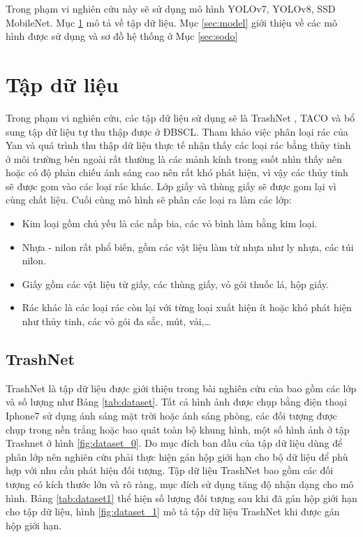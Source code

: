 \documentclass[../the.tex]{subfiles}
\begin{document}
{\fontsize{13}{12} \selectfont

Trong phạm vi nghiên cứu này sẽ sử dụng mô hình YOLOv7, YOLOv8, SSD MobileNet. Mục \ref{sec:dataset} mô tả về tập dữ liệu. Mục \ref{sec:model} giới thiệu về các mô hình được sử dụng và sơ đồ hệ thống ở Mục \ref{sec:sodo}

}
\section{Tập dữ liệu}
\label{sec:dataset}

{\fontsize{13}{12} \selectfont

	Trong phạm vi nghiên cứu, các tập dữ liệu sử dụng sẽ là TrashNet \cite{yang2016classification}, TACO \cite{proença2020taco} và bổ sung tập dữ liệu tự thu thập được ở ĐBSCL.
	Tham khảo việc phân loại rác của Yan \cite{yang2016classification} và quá trình thu thập dữ liệu thực tế nhận thấy các loại rác bằng thủy tinh ở môi trường bên ngoài rất thường là các mảnh kính trong suốt nhìn thấy nên hoặc có độ phản chiếu ánh sáng cao nên rất khó phát hiện, vì vậy các thủy tinh sẽ được gom vào các loại rác khác.
	Lớp giấy và thùng giấy sẽ được gom lại vì cùng chất liệu. Cuối cùng mô hình sẽ phân các loại ra làm các lớp:
	\begin{itemize}
		\item Kim loại gồm chủ yếu là các nắp bia, các vỏ bình làm bằng kim loại.
		\item Nhựa - nilon rất phổ biến, gồm các vật liệu làm từ nhựa như ly nhựa, các túi nilon.
		\item Giấy gồm các vật liệu từ giấy, các thùng giấy, vỏ gói thuốc lá, hộp giấy.
		\item Rác khác là các loại rác còn lại với từng loại xuất hiện ít hoặc khó phát hiện như thủy tinh, các vỏ gói đa sắc,
		      mút, vải,\dots
	\end{itemize}
}

\subsection{TrashNet}
\label{sec:trashnet}
{\fontsize{13}{12} \selectfont

	TrashNet là tập dữ liệu được giới thiệu trong bài nghiên cứu của \cite{yang2016classification} bao gồm các lớp và số lượng như Bảng \ref{tab:dataset}. Tất cả hình ảnh được chụp bằng điện thoại Iphone7 sử dụng ánh sáng mặt trời hoặc ánh sáng phòng, các đối tượng được chụp trong nền trắng hoặc bao quát toàn bộ khung hình, một số hình ảnh ở tập Trashnet ở hình
	\ref{fig:dataset_0}.
	Do mục đích ban đầu của tập dữ liệu dùng để phân lớp nên nghiên cứu phải thực hiện gán hộp giới hạn cho bộ dữ liệu để phù hợp với nhu cầu phát hiện đối tượng. Tập dữ liệu TrashNet bao gồm các đối tượng có kích thước lớn và rõ ràng, mục đích sử dụng tăng độ nhận dạng cho mô hình. Bảng \ref{tab:dataset1} thể hiện số lượng đối tượng sau khi đã gán hộp giới hạn cho tập dữ liệu, hình
	\ref{fig:dataset_1} mô tả tập dữ liệu TrashNet khi được gán hộp giới hạn.

}
\end{document}
